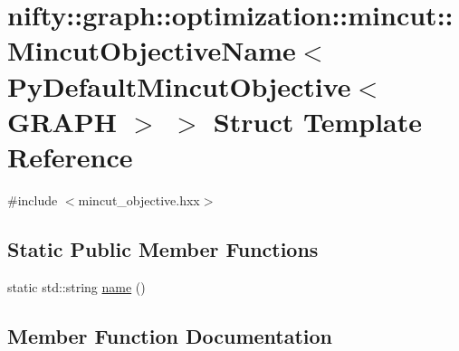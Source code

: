 \hypertarget{structnifty_1_1graph_1_1optimization_1_1mincut_1_1MincutObjectiveName_3_01PyDefaultMincutObjective_3_01GRAPH_01_4_01_4}{}\section{nifty\+:\+:graph\+:\+:optimization\+:\+:mincut\+:\+:Mincut\+Objective\+Name$<$ Py\+Default\+Mincut\+Objective$<$ G\+R\+A\+P\+H $>$ $>$ Struct Template Reference}
\label{structnifty_1_1graph_1_1optimization_1_1mincut_1_1MincutObjectiveName_3_01PyDefaultMincutObjective_3_01GRAPH_01_4_01_4}


{\ttfamily \#include $<$mincut\+\_\+objective.\+hxx$>$}

\subsection*{Static Public Member Functions}
\begin{DoxyCompactItemize}
\item 
static std\+::string \hyperlink{structnifty_1_1graph_1_1optimization_1_1mincut_1_1MincutObjectiveName_3_01PyDefaultMincutObjective_3_01GRAPH_01_4_01_4_a3faf9be064845fc580b0f01a261d663c}{name} ()
\end{DoxyCompactItemize}


\subsection{Member Function Documentation}
\hypertarget{structnifty_1_1graph_1_1optimization_1_1mincut_1_1MincutObjectiveName_3_01PyDefaultMincutObjective_3_01GRAPH_01_4_01_4_a3faf9be064845fc580b0f01a261d663c}{}
